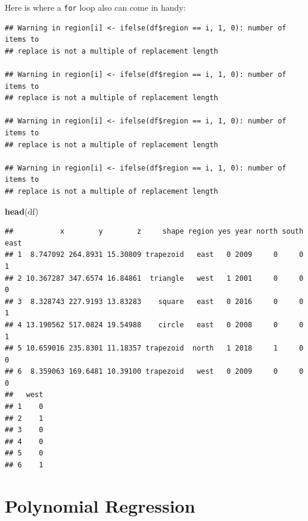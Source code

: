 \documentclass[]{book}
\newenvironment{Shaded}{\begin{snugshade}}{\end{snugshade}}
\newcommand{\KeywordTok}[1]{\textcolor[rgb]{0.13,0.29,0.53}{\textbf{#1}}}
\newcommand{\DecValTok}[1]{\textcolor[rgb]{0.00,0.00,0.81}{#1}}
\newcommand{\ControlFlowTok}[1]{\textcolor[rgb]{0.13,0.29,0.53}{\textbf{#1}}}
\newcommand{\OperatorTok}[1]{\textcolor[rgb]{0.81,0.36,0.00}{\textbf{#1}}}
\newcommand{\NormalTok}[1]{#1}
\theoremstyle{definition}
\theoremstyle{definition}
\theoremstyle{definition}
\theoremstyle{remark}
\begin{document}
Here is where a \texttt{for} loop also can come in handy:

\begin{Shaded}
\end{Shaded}

\begin{verbatim}
## Warning in region[i] <- ifelse(df$region == i, 1, 0): number of items to
## replace is not a multiple of replacement length

## Warning in region[i] <- ifelse(df$region == i, 1, 0): number of items to
## replace is not a multiple of replacement length

## Warning in region[i] <- ifelse(df$region == i, 1, 0): number of items to
## replace is not a multiple of replacement length

## Warning in region[i] <- ifelse(df$region == i, 1, 0): number of items to
## replace is not a multiple of replacement length
\end{verbatim}

\begin{Shaded}
\begin{Highlighting}[]
\KeywordTok{head}\NormalTok{(df)}
\end{Highlighting}
\end{Shaded}

\begin{verbatim}
##           x        y        z     shape region yes year north south east
## 1  8.747092 264.8931 15.30809 trapezoid   east   0 2009     0     0    1
## 2 10.367287 347.6574 16.84861  triangle   west   1 2001     0     0    0
## 3  8.328743 227.9193 13.83283    square   east   0 2016     0     0    1
## 4 13.190562 517.0824 19.54988    circle   east   0 2008     0     0    1
## 5 10.659016 235.8301 11.18357 trapezoid  north   1 2018     1     0    0
## 6  8.359063 169.6481 10.39100 trapezoid   west   0 2009     0     0    0
##   west
## 1    0
## 2    1
## 3    0
## 4    0
## 5    0
## 6    1
\end{verbatim}

\section{Polynomial Regression}\label{polynomial-regression}
\end{document}
